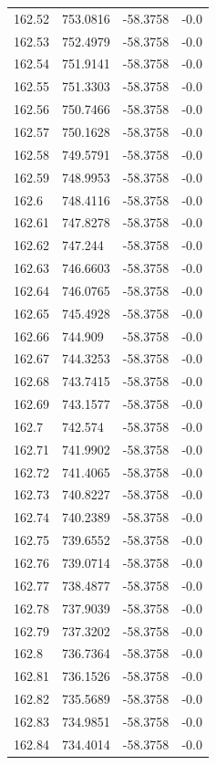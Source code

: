 \begin{table}[H]
\begin{tabular}{llll}
162.52 & 753.0816 & -58.3758 & -0.0 \\
162.53 & 752.4979 & -58.3758 & -0.0 \\
162.54 & 751.9141 & -58.3758 & -0.0 \\
162.55 & 751.3303 & -58.3758 & -0.0 \\
162.56 & 750.7466 & -58.3758 & -0.0 \\
162.57 & 750.1628 & -58.3758 & -0.0 \\
162.58 & 749.5791 & -58.3758 & -0.0 \\
162.59 & 748.9953 & -58.3758 & -0.0 \\
162.6 & 748.4116 & -58.3758 & -0.0 \\
162.61 & 747.8278 & -58.3758 & -0.0 \\
162.62 & 747.244 & -58.3758 & -0.0 \\
162.63 & 746.6603 & -58.3758 & -0.0 \\
162.64 & 746.0765 & -58.3758 & -0.0 \\
162.65 & 745.4928 & -58.3758 & -0.0 \\
162.66 & 744.909 & -58.3758 & -0.0 \\
162.67 & 744.3253 & -58.3758 & -0.0 \\
162.68 & 743.7415 & -58.3758 & -0.0 \\
162.69 & 743.1577 & -58.3758 & -0.0 \\
162.7 & 742.574 & -58.3758 & -0.0 \\
162.71 & 741.9902 & -58.3758 & -0.0 \\
162.72 & 741.4065 & -58.3758 & -0.0 \\
162.73 & 740.8227 & -58.3758 & -0.0 \\
162.74 & 740.2389 & -58.3758 & -0.0 \\
162.75 & 739.6552 & -58.3758 & -0.0 \\
162.76 & 739.0714 & -58.3758 & -0.0 \\
162.77 & 738.4877 & -58.3758 & -0.0 \\
162.78 & 737.9039 & -58.3758 & -0.0 \\
162.79 & 737.3202 & -58.3758 & -0.0 \\
162.8 & 736.7364 & -58.3758 & -0.0 \\
162.81 & 736.1526 & -58.3758 & -0.0 \\
162.82 & 735.5689 & -58.3758 & -0.0 \\
162.83 & 734.9851 & -58.3758 & -0.0 \\
162.84 & 734.4014 & -58.3758 & -0.0 \\

\end{tabular}
\end{table}
